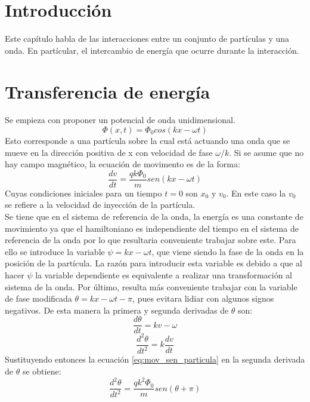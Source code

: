 \section{Introducción}
Este capítulo habla de las interacciones entre un conjunto de partículas y una onda. En partícular, el intercambio de energía que ocurre durante la interacción.
\section{Transferencia de energía}
Se empieza con proponer un potencial de onda unidimensional.
\begin{equation}
\label{eq:potencial_sinosoidal}
\Phi(x,t) = \Phi_0 cos(kx-\omega t)
\end{equation}
Esto corresponde a una partícula sobre la cual está actuando una onda que se mueve en la dirección positiva de x con velocidad de fase $\omega /k$. Si se asume que no hay campo magnético, la ecuación de movimento es de la forma:
\begin{equation}
\label{eq:mov_sen_particula}
\frac{dv}{dt}=\frac{qk\Phi_0}{m}sen(kx-\omega t)
\end{equation}
Cuyas condiciones iniciales para un tiempo $t=0$ son $x_0$ y $v_0$. En este caso la $v_0$ se refiere a la velocidad de inyección de la partícula.\\
Se tiene que en el sistema de referencia de la onda, la energía es una constante de movimiento ya que el hamiltoniano es independiente del tiempo en el sistema de referencia de la onda por lo que resultaria conveniente trabajar sobre este. Para ello se introduce la variable $\psi= kx - \omega t$, que viene siendo la fase de la onda en la posición de la partícula. La razón para introducir esta variable es debido a que al hacer $\psi$ la variable dependiente es equivalente a realizar una transformación al sistema de la onda. Por último, resulta más conveniente trabajar con la variable de fase modificada $\theta = kx -\omega t -\pi$, pues evitara lidiar con algunos signos negativos. De esta manera la primera y segunda derivadas de $\theta$ son:
\begin{equation}
\label{eq:deriv_theta}
\frac{d\theta}{dt}=kv -\omega
\end{equation}
\begin{equation}
\label{eq:segunda_deriv_theta}
\frac{d^2\theta}{dt^2}=k \frac{dv}{dt}
\end{equation}
Sustituyendo entonces la ecuación \ref{eq:mov_sen_particula} en la segunda derivada de $\theta$ se obtiene:
\begin{equation}
\label{eq:seg_deriv_theta_sustitucion}
\frac{d^2\theta}{dt^2}=\frac{qk^2\Phi_0}{m}sen(\theta + \pi)
\end{equation}
